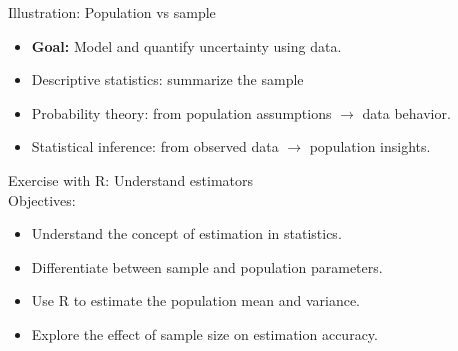 \documentclass[main.tex]{subfiles}
\begin{document}
\begin{frame}

\begin{block}{Illustration: Population vs sample}
    \begin{center}
\end{center}
\vspace{0.5em}
\begin{itemize}
  \item \textbf{Goal:} Model and quantify uncertainty using data.
  \item Descriptive statistics:  summarize the sample

  \item Probability theory: from population assumptions $\rightarrow$ data behavior.
  \item Statistical inference: from observed data $\rightarrow$ population insights.
\end{itemize}
\end{block}
\end{frame}


\begin{frame}
\begin{block}{Exercise with R: Understand estimators\\}
Objectives:
\begin{itemize}
  \item Understand the concept of estimation in statistics.
  \item Differentiate between sample and population parameters.
  \item Use R to estimate the population mean and variance.
  \item Explore the effect of sample size on estimation accuracy.
\end{itemize}
\end{block}
\end{frame}
\end{document}
